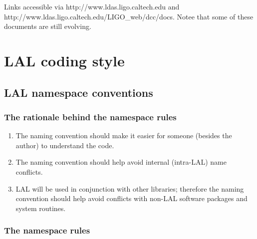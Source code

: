\documentclass[]{ligodcc}
\begin{document}
\begin{table}
Links accessible via http://www.ldas.ligo.caltech.edu and \\
http://www.ldas.ligo.caltech.edu/LIGO\_web/dcc/docs. Notee that
some of these documents are still evolving.
\end{table}


\section{LAL coding style}
\label{sec:codingstyle}

\subsection{LAL namespace conventions}

\subsubsection{The rationale behind the namespace rules}

\begin{enumerate}
\item
The naming convention should make  it easier for someone
(besides the author) to understand the code.

\item
The naming convention should help avoid  internal (intra-LAL)
name conflicts.

\item
LAL will be used in conjunction with other libraries;
therefore the naming convention should help avoid conflicts with
non-LAL software packages and system routines.

\end{enumerate}

\subsubsection{The namespace rules}
\end{document}
